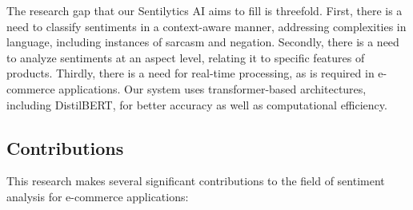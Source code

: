 \documentclass[11pt,a4paper]{article}
\begin{document}
The research gap that our Sentilytics AI aims to fill is threefold. First, there is a need to classify sentiments in a context-aware manner, addressing complexities in language, including instances of sarcasm and negation. Secondly, there is a need to analyze sentiments at an aspect level, relating it to specific features of products. Thirdly, there is a need for real-time processing, as is required in e-commerce applications. Our system uses transformer-based architectures, including DistilBERT, for better accuracy as well as computational efficiency.

\subsection{Contributions}

This research makes several significant contributions to the field of sentiment analysis for e-commerce applications:
\end{document}
